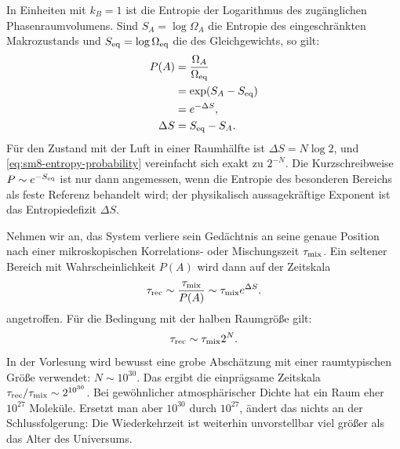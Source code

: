 In Einheiten mit \(k_B=1\) ist die Entropie der Logarithmus des zugänglichen Phasenraumvolumens. Sind \(S_A=\log\Omega_A\) die Entropie des eingeschränkten Makrozustands und \(S_{\rm eq}=\log\Omega_{\rm eq}\) die des Gleichgewichts, so gilt:
\begin{equation}
 \begin{aligned}
 P(A)
 &=\frac{\Omega_A}{\Omega_{\rm eq}}\\
 &=\exp\!\left(S_A-S_{\rm eq}\right)\\
 &=e^{-\Delta S},\\
 \Delta S&=S_{\rm eq}-S_A.
 \end{aligned}
 \label{eq:sm8-entropy-probability}
\end{equation}
Für den Zustand mit der Luft in einer Raumhälfte ist \(\Delta S=N\log 2\), und \eqref{eq:sm8-entropy-probability} vereinfacht sich exakt zu \(2^{-N}\).
Die Kurzschreibweise \(P\sim e^{-S_{\rm eq}}\) ist nur dann angemessen, wenn die Entropie des besonderen Bereichs als feste Referenz behandelt wird; der physikalisch aussagekräftige Exponent ist das Entropiedefizit \(\Delta S\).

\begin{classroomqa}
\end{classroomqa}

Nehmen wir an, das System verliere sein Gedächtnis an seine genaue Position nach einer mikroskopischen Korrelations- oder Mischungszeit \(\tau_{\rm mix}\). Ein seltener Bereich mit Wahrscheinlichkeit \(P(A)\) wird dann auf der Zeitskala
\begin{equation}
 \tau_{\rm rec}
 \sim \frac{\tau_{\rm mix}}{P(A)}
 \sim \tau_{\rm mix}e^{\Delta S}.
 \label{eq:sm8-recurrence-time-general}
\end{equation}
angetroffen. Für die Bedingung mit der halben Raumgröße gilt:
\begin{equation}
 \tau_{\rm rec}\sim\tau_{\rm mix}2^N.
 \label{eq:sm8-recurrence-time-half}
\end{equation}
In der Vorlesung wird bewusst eine grobe Abschätzung mit einer raumtypischen Größe verwendet:
\(N\sim10^{30}\). Das ergibt die einprägsame Zeitskala
\(\tau_{\rm rec}/\tau_{\rm mix}\sim2^{10^{30}}\). Bei gewöhnlicher atmosphärischer Dichte hat ein Raum eher \(10^{27}\) Moleküle. Ersetzt man aber \(10^{30}\) durch \(10^{27}\), ändert das nichts an der Schlussfolgerung: Die Wiederkehrzeit ist weiterhin unvorstellbar viel größer als das Alter des Universums.

